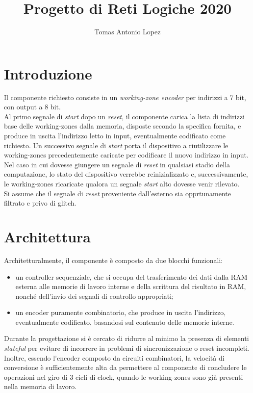 \documentclass[11pt,a4paper]{article}
\title{\textbf{Progetto di Reti Logiche 2020}}
\author{Tomas Antonio Lopez}
\begin{document}
\maketitle
\tableofcontents
\listoffigures

\newpage

\section{Introduzione}
Il componente richiesto consiste in un \emph{working-zone encoder} per indirizzi a 7 bit, con output a 8 bit.\\
Al primo segnale di \emph{start} dopo un \emph{reset}, il componente carica la lista di indirizzi base delle working-zones dalla memoria, disposte
secondo la specifica fornita, e produce in uscita l'indirizzo letto in input, eventualmente codificato come richiesto. Un successivo segnale di
\emph{start} porta il dispositivo a riutilizzare le working-zones precedentemente caricate per codificare il nuovo indirizzo in input. Nel caso in cui
dovesse giungere un segnale di \emph{reset} in qualsiasi stadio della computazione, lo stato del dispositivo verrebbe reinizializzato e, successivamente,
le working-zones ricaricate qualora un segnale \emph{start} alto dovesse venir rilevato.\\
Si assume che il segnale di \emph{reset} proveniente dall'esterno sia opprtunamente filtrato e privo di glitch.

\section{Architettura}
Architetturalmente, il componente è composto da due blocchi funzionali:
\begin{itemize}
    \item un controller sequenziale, che si occupa del trasferimento dei dati dalla RAM esterna alle memorie di lavoro interne e della scrittura del
        risultato in RAM, nonché dell'invio dei segnali di controllo appropriati;
    \item un encoder puramente combinatorio, che produce in uscita l'indirizzo, eventualmente codificato, basandosi sul contenuto delle memorie
        interne.
\end{itemize}
Durante la progettazione si è cercato di ridurre al minimo la presenza di elementi \emph{stateful} per evitare di incorrere in problemi di
sincronizzazione o reset incompleti. Inoltre, essendo l'encoder composto da circuiti combinatori, la velocità di conversione è sufficientemente alta da
permettere al componente di concludere le operazioni nel giro di 3 cicli di clock, quando le working-zones sono già presenti nella memoria di lavoro.
\end{document}
